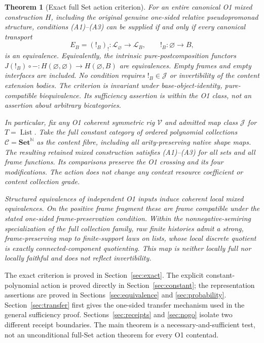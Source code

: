\documentclass[11pt,a4paper]{article}
\newtheorem{theorem}{Theorem}[section]
\theoremstyle{definition}
\newcommand{\Set}{\mathbf{Set}}
\newcommand{\V}{\mathcal V}
\newcommand{\Lcat}{\mathcal L}
\newcommand{\J}{\mathcal J}
\newcommand{\C}{\mathcal C}
\newcommand{\List}{\operatorname{List}}
\begin{document}
\begin{theorem}[Exact full Set action criterion]\label{thm:main}
For an entire canonical O1 mixed construction $H$, including the original
genuine one-sided relative pseudopromonad structure, conditions
\textup{(A1)--(A3)} can be supplied if and only if every canonical transport
\[
 E_B=(!_B)_!:\Lcat_\varnothing\longrightarrow\Lcat_B,
 \qquad !_B:\varnothing\longrightarrow B,
\]
is an equivalence. Equivalently, the intrinsic pure-postcomposition functors
$J(!_B)\circ-:H(\varnothing,\varnothing)\to H(\varnothing,B)$ are equivalences.
Empty frames and empty interfaces are included. No condition requires
$!_B\in\J$ or invertibility of the content extension bodies.
The criterion is invariant under base-object-identity, pure-compatible
biequivalence. Its sufficiency assertion is within the O1 class, not an
assertion about arbitrary bicategories.

In particular, fix any O1 coherent symmetric rig $\V$ and admitted map class $\J$ for
$T=\List$. Take the full constant category of ordered polynomial collections
$\C=\Set^{\mathbb N}$ as the content fibre, including all arity-preserving
native shape maps. The resulting retained mixed construction satisfies
\textup{(A1)--(A3)} for all sets and all frame functions. Its comparisons
preserve the O1 crossing and its four modifications. The action does not
change any context resource coefficient or content collection grade.

Structured equivalences of independent O1 inputs induce coherent local
mixed equivalences. On the positive frame fragment these are frame compatible
under the stated one-sided frame-preservation condition. Within the
nonnegative-semiring specialization of the full collection family, raw finite
histories admit a strong, frame-preserving map to finite-support laws on lists,
whose local discrete quotient is exactly connected-component quotienting.
This map is neither locally full nor locally faithful and does not reflect
invertibility.
\end{theorem}
The exact criterion is proved in Section~\ref{sec:exact}. The explicit
constant-polynomial action is proved directly in Section~\ref{sec:constant};
the representation assertions are proved in Sections~\ref{sec:equivalence}
and \ref{sec:probability}. Section~\ref{sec:transfer} first gives the
one-sided transfer mechanism used in the general sufficiency proof.
Sections~\ref{sec:receipts} and \ref{sec:nogo} isolate two different receipt
boundaries. The main theorem is a necessary-and-sufficient test, not an
unconditional full-Set action theorem for every O1 contentad.
\end{document}
